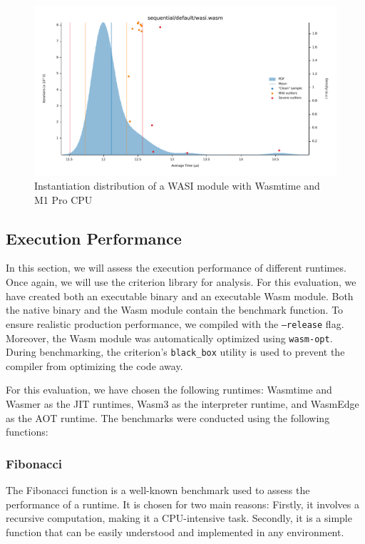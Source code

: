 \begin{figure}[htbp]
    \centering
        \includegraphics[width=1\linewidth]{images/benches/sequential_default_wasi.pdf}
    \caption{Instantiation distribution of a WASI module with Wasmtime and M1 Pro CPU}
    \label{fig:bench:instantiation:wasi}
\end{figure}


\subsection{Execution Performance}
\label{subsec:executation-performance}

In this section, we will assess the execution performance of different runtimes. Once again, we will use the criterion library for analysis. For this evaluation, we have created both an executable binary and an executable Wasm module. Both the native binary and the Wasm module contain the benchmark function. To ensure realistic production performance, we compiled with the \texttt{--release} flag. Moreover, the Wasm module was automatically optimized using \texttt{wasm-opt}. During benchmarking, the criterion's \texttt{black\_box} utility is used to prevent the compiler from optimizing the code away.

For this evaluation, we have chosen the following runtimes: Wasmtime and Wasmer as the JIT runtimes, Wasm3 as the interpreter runtime, and WasmEdge as the AOT runtime. The benchmarks were conducted using the following functions:

\subsubsection{Fibonacci}

The Fibonacci function is a well-known benchmark used to assess the performance of a runtime. It is chosen for two main reasons: Firstly, it involves a recursive computation, making it a CPU-intensive task. Secondly, it is a simple function that can be easily understood and implemented in any environment.

